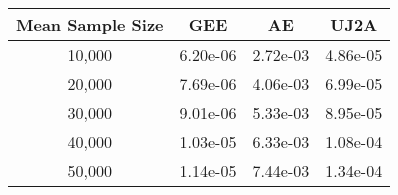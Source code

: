 \begin{tabular}{cccc}
\toprule
Mean Sample Size &       GEE &        AE &      UJ2A \\
\midrule
          10,000 &  6.20e-06 &  2.72e-03 &  4.86e-05 \\
          20,000 &  7.69e-06 &  4.06e-03 &  6.99e-05 \\
          30,000 &  9.01e-06 &  5.33e-03 &  8.95e-05 \\
          40,000 &  1.03e-05 &  6.33e-03 &  1.08e-04 \\
          50,000 &  1.14e-05 &  7.44e-03 &  1.34e-04 \\
\bottomrule
\end{tabular}

